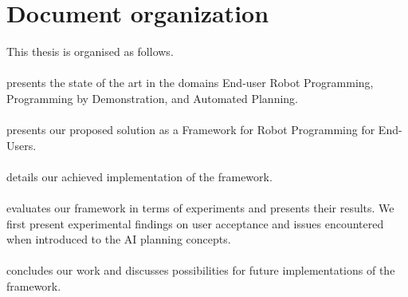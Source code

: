 \section{Document organization}
This thesis is organised as follows. 

\paragraph{} presents the state of the art in the domains End-user Robot Programming, Programming by Demonstration, and Automated Planning.

\paragraph{} presents our proposed solution as a Framework for Robot Programming for End-Users.

\paragraph{} details our achieved implementation of the framework. 

\paragraph{} evaluates our framework in terms of experiments and presents their results. We first present experimental findings on user acceptance and issues encountered when introduced to the AI planning concepts.

\paragraph{} concludes our work and discusses possibilities for future implementations of the framework.
